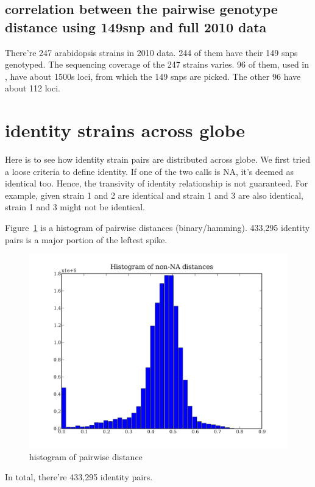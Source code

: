 \documentclass[a4paper,10pt]{article}
\begin{document}
\subsection{correlation between the pairwise genotype distance using 149snp and full 2010 data}
There're 247 arabidopsis strains in 2010 data. 244 of them have their 149 snps genotyped. The sequencing coverage of the 247 strains varies. 96 of them, used in \cite{Nordborg2005}, have about 1500s loci, from which the 149 snps are picked. The other 96 have about 112 loci.


\section{identity strains across globe}
Here is to see how identity strain pairs are distributed across globe. We first tried a loose criteria to define identity. If one of the two calls is NA, it's deemed as identical too. Hence, the transivity of identity relationship is not guaranteed. For example, given strain 1 and 2 are identical and strain 1 and 3 are also identical, strain 1 and 3 might not be identical.

Figure~\ref{f29} is a histogram of pairwise distances (binary/hamming). 433,295 identity pairs is a major portion of the leftest spike.

\begin{figure}
\includegraphics[width=1\textwidth]{figures/data_d110_c0_5_distance_hist.png}
\caption{histogram of pairwise distance}\label{f29}
\end{figure}

In total, there're 433,295 identity pairs.
\end{document}

